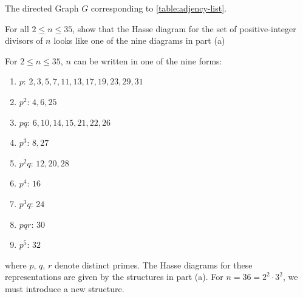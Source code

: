 \documentclass[a4paper, english, 12pt]{article} %
\begin{document}
\begin{Figure}
  \caption{The directed Graph $G$ corresponding to \cref{table:adjency-list}.}
\end{Figure}


\begin{problem}[16]
  \begin{subproblem}[2]
    For all $2 \leq n \leq 35$, show that the Hasse diagram for the set of
    positive-integer divisors of $n$ looks like one of the nine diagrams in part (a)
  \end{subproblem}
\end{problem}

\begin{answer}
  For $2 \leq n \leq 35$, $n$ can be written in one of the nine forms:
  \begin{enumerate}[label=($\roman*$)]
    \item $p$: $2, 3, 5, 7, 11, 13, 17, 19, 23, 29, 31$
    \item $p^2$: $4, 6, 25$
    \item $pq$: $6, 10, 14, 15, 21, 22, 26$
    \item $p^3$: $8, 27$
    \item $p^2q$: $12, 20, 28$
    \item $p^4$: $16$
    \item $p^3 q$: $24$
    \item $pqr$: $30$
    \item $p^5$: $32$
  \end{enumerate}
  where $p$, $q$, $r$ denote distinct primes. The Hasse diagrams for these
  representations are given by the structures in part (a). For $n = 36 = 2^2
  \cdot 3^2$, we must introduce a new structure.
\end{answer}
\end{document}
